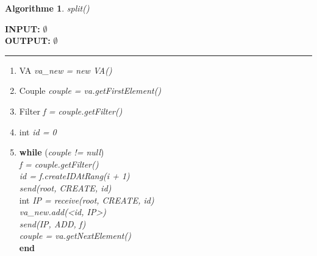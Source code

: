 \documentclass[a4paper,11pt]{report}
\begin{document}
\newtheorem{algorithme}{Algorithme}
\begin{algorithme}
	split()
\end{algorithme}

\begin{flushleft}
	\begin{framed}
		\textbf{INPUT:} $\emptyset$\\
		\textbf{OUTPUT:} $\emptyset$
		\noindent\rule{\linewidth}{0.5pt}

		\begin{enumerate}
			\item VA \textit{va\_new = new VA()}
			\item Couple \textit{couple = va.getFirstElement()}
			\item Filter \textit{f = couple.getFilter()}
			\item int \textit{id = 0}
			\item 
		\begin{tabbing}
			\textbf{while} (\= \textit{couple != null})\\
					\> \textit{f = couple.getFilter()}\\
					\> \textit{id = f.createIDAtRang(i + 1)}\\
					\> \textit{send(root, CREATE, id)}\\
					\> int \textit{IP = receive(root, CREATE, id)}\\
					\> \textit{va\_new.add(<id, IP>)}\\
					\> \textit{send(IP, ADD, f)}\\
					\> \textit{couple = va.getNextElement()}\\
			\textbf{end}\\
	    \end{tabbing}
		\end{enumerate}
	\end{framed}
\end{flushleft}
\end{document}
